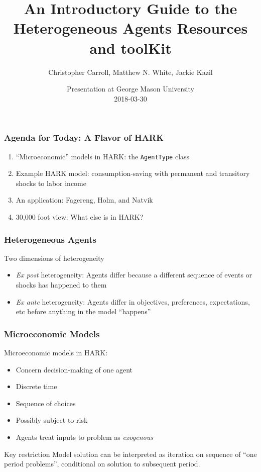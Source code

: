 \documentclass[11ptt]{beamer}
\author{Christopher Carroll, Matthew N. White, Jackie Kazil}
\title{An Introductory Guide to the \\ Heterogeneous Agents Resources and toolKit}
\date{Presentation at George Mason University \\ 2018-03-30}
\newcommand{\bi}{\begin{itemize}}
\newcommand{\ei}{\end{itemize}}
\begin{document}
\begin{frame}
\maketitle
\end{frame}


\begin{frame}
\frametitle{Agenda for Today: A Flavor of HARK}
\begin{enumerate}
\item ``Microeconomic'' models in HARK: the \texttt{AgentType} class

\item Example HARK model: consumption-saving with permanent and transitory shocks to labor income

\item An application: Fagereng, Holm, and Natvik

\item 30,000 foot view: What else is in HARK?
\end{enumerate}
\end{frame}


\begin{frame}
\frametitle{Heterogeneous Agents}
\begin{block}{Two dimensions of heterogeneity}
\bi
\item \textit{Ex post} heterogeneity: Agents differ because a different sequence of events or shocks has happened to them

\item \textit{Ex ante} heterogeneity: Agents differ in objectives, preferences, expectations, etc before anything in the model ``happens''
\ei
\end{block}

\end{frame}


\begin{frame}
\frametitle{Microeconomic Models}
\begin{block}{Microeconomic models in HARK:}
\bi
\item Concern decision-making of one agent

\item Discrete time

\item Sequence of choices

\item Possibly subject to risk

\item Agents treat inputs to problem as \textit{exogenous}
\ei
\end{block}

\begin{block}{Key restriction}
Model solution can be interpreted as iteration on sequence of ``one period problems'', conditional on solution to subsequent period.
\end{block}
\end{frame}
\end{document}
